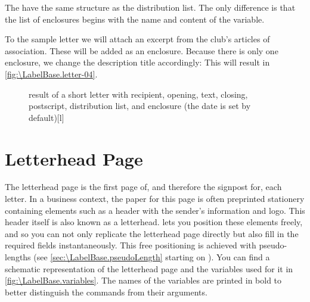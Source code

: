 \begin{Declaration}
\end{Declaration}
The  have the same structure as the distribution list. The
only difference is that the list of enclosures begins with the name and
content of the 
variable.
\begin{Example}
  To the sample letter we will attach an excerpt from the club's articles of
  association. These will be added as an enclosure. Because there is only one
  enclosure, we change the description title accordingly:
  This will result in \autoref{fig:\LabelBase.letter-04}.
  \begin{figure}
    \setcapindent{0pt}%
    \begin{captionbeside}{%
        result of a short letter with recipient, opening, text, closing,
        postscript, distribution list, and enclosure (the date is set by
        default)}[l]
    \end{captionbeside}
    \label{fig:\LabelBase.letter-04}
  \end{figure}
\end{Example}
%
\EndIndexGroup
%
\EndIndexGroup




\section{Letterhead Page}
\BeginIndexGroup
{}%

The letterhead page is the first page of, and therefore the signpost for, each
letter. In a business context, the paper for this page is often preprinted
stationery containing elements such as a header with the sender's information
and logo. This header itself is also known as a letterhead. \KOMAScript{} lets
you position these elements freely, and so you can not only replicate the
letterhead page directly but also fill in the required fields instantaneously.
This free positioning is achieved with pseudo-lengths (see
\autoref{sec:\LabelBase.pseudoLength} starting on
). You can find a schematic
representation of the letterhead page and the variables used for it in
\autoref{fig:\LabelBase.variables}. The names of the variables are printed in
bold to better distinguish the commands from their arguments.


